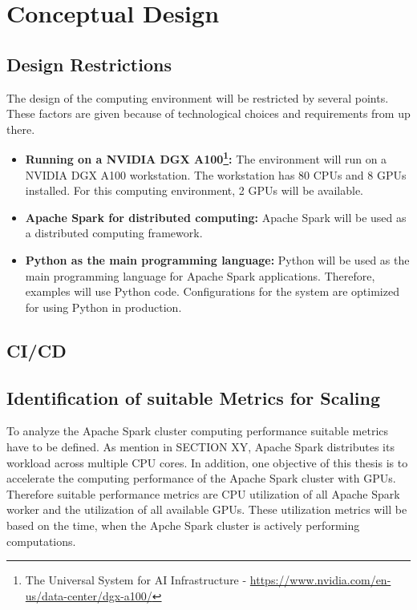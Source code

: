 \chapter{Conceptual Design}
\label{sec:design}
%


\section{Design Restrictions}
\label{sec:05_restrictions}
The design of the computing environment will be restricted by several points. These factors are given because of technological choices and requirements from up there.

\begin{itemize}
\item \textbf{Running on a NVIDIA DGX A100\footnote{The Universal System for AI Infrastructure - \url{https://www.nvidia.com/en-us/data-center/dgx-a100/}}:} The environment will run on a NVIDIA DGX A100 workstation. The workstation has 80 CPUs and 8 GPUs installed. For this computing environment, 2 GPUs will be available.

\item \textbf{Apache Spark for distributed computing:} Apache Spark will be used as a distributed computing framework.

\item \textbf{Python as the main programming language:} Python will be used as the main programming language for Apache Spark applications. Therefore, examples will use Python code. Configurations for the system are optimized for using Python in production.
\end{itemize}

\section{CI/CD}


\section{Identification of suitable Metrics for Scaling}
To analyze the Apache Spark cluster computing performance suitable metrics have to be defined.
As mention in SECTION XY, Apache Spark distributes its workload across multiple CPU cores. In addition, one objective of this thesis is to accelerate the computing performance of the Apache Spark cluster with GPUs.
Therefore suitable performance metrics are CPU utilization of all Apache Spark worker and the utilization of all available GPUs.
These utilization metrics will be based on the time, when the Apche Spark cluster is actively performing computations.


